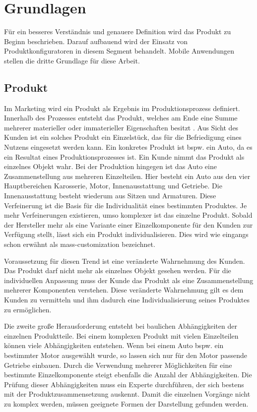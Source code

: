 \chapter{Grundlagen} \label{chapter_2}
Für ein besseres Verständnis und genauere Definition wird das Produkt zu Beginn beschrieben. Darauf aufbauend wird der Einsatz von Produktkonfiguratoren in diesem Segment behandelt. Mobile Anwendungen stellen die dritte Grundlage für diese Arbeit.

\section{Produkt}
Im Marketing wird ein Produkt als Ergebnis im Produktionsprozess definiert. Innerhalb des Prozesses entsteht  das Produkt, welches am Ende eine Summe mehrerer materieller oder immaterieller Eigenschaften besitzt \cite{bib:product}. Aus Sicht des Kunden ist ein solches Produkt ein Einzelstück, das für die Befriedigung eines Nutzens eingesetzt werden kann. Ein konkretes Produkt ist bspw. ein Auto, da es ein Resultat eines Produktionsprozesses ist. Ein Kunde nimmt das Produkt als einzelnes Objekt wahr. Bei der Produktion hingegen ist das Auto eine Zusammenstellung aus mehreren Einzelteilen. Hier besteht ein Auto aus den vier Hauptbereichen Karosserie, Motor, Innenausstattung und Getriebe. Die Innenausstattung besteht wiederum aus Sitzen und Armaturen. Diese Verfeinerung ist die Basis für die Individualität eines bestimmten Produktes. Je mehr Verfeinerungen existieren, umso komplexer ist das einzelne Produkt. Sobald der Hersteller mehr als eine Variante einer Einzelkomponente für den Kunden zur Verfügung stellt, lässt sich ein Produkt individualisieren. Dies wird wie eingangs schon erwähnt als mass-customization bezeichnet. \par 

Voraussetzung für diesen Trend ist eine veränderte Wahrnehmung des Kunden. Das Produkt darf nicht mehr als einzelnes Objekt gesehen werden. Für die individuellen Anpassung muss der Kunde das Produkt als eine Zusammenstellung mehrerer Komponenten verstehen. Diese veränderte Wahrnehmung gilt es dem Kunden zu vermitteln und ihm dadurch eine Individualisierung seines Produktes zu ermöglichen. \par

Die zweite große Herausforderung entsteht bei baulichen Abhängigkeiten der einzelnen Produktteile. Bei einem komplexen Produkt mit vielen Einzelteilen können viele Abhängigkeiten entstehen. Wenn bei einem Auto bspw. ein bestimmter Motor ausgewählt wurde, so lassen sich nur für den Motor passende Getriebe einbauen. Durch die Verwendung mehrerer Möglichkeiten für eine bestimmte Einzelkomponente steigt ebenfalls die Anzahl der Abhängigkeiten. Die Prüfung dieser Abhängigkeiten muss ein Experte durchführen, der sich bestens mit der Produktzusammensetzung auskennt. Damit die einzelnen Vorgänge nicht zu komplex werden, müssen geeignete Formen der Darstellung gefunden werden.

